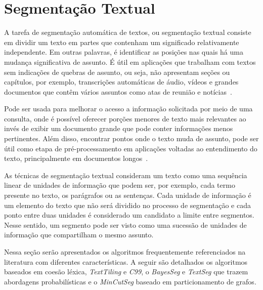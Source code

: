 
\section{Segmentação Textual} \label{sec:segmentacao}






A tarefa de segmentação automática de textos, ou segmentação textual consiste em dividir um texto em partes que contenham um significado relativamente independente. Em outras palavras, é identificar as posições nas quais há uma mudança significativa de assunto. É útil em aplicações que trabalham com textos sem indicações de quebras de assunto, ou seja, não apresentam seções ou capítulos, por exemplo, transcrições automáticas de áudio, vídeos e grandes documentos que contêm vários assuntos como atas de reunião e notícias~\cite{Aggarwal2018, bokaei2015a, sakahara2014a, misra2009a, Eis2008}.

Pode ser usada para melhorar o acesso a informação solicitada por meio de uma consulta, onde é possível oferecer porções menores de texto mais relevantes ao invés de exibir um documento grande que pode conter informações menos pertinentes.  Além disso, encontrar pontos onde o texto muda de assunto, pode ser útil como etapa de pré-processamento em aplicações voltadas ao entendimento do texto, principalmente em documentos longos~\cite{Choi2001-LSA}.

As técnicas de segmentação textual consideram um texto como uma sequência linear de unidades de informação que podem ser, por exemplo, cada termo presente no texto, os parágrafos ou as sentenças. Cada unidade de informação é um elemento do texto que não será dividido no processo de segmentação e cada ponto entre duas unidades é considerado um candidato a limite entre segmentos. Nesse sentido, um segmento pode ser visto como uma sucessão de unidades de informação que compartilham o mesmo assunto.


Nessa seção serão apresentados os algoritmos frequentemente referenciados na literatura  com diferentes características. A seguir são detalhados os algoritmos baseados em coesão léxica, \textit{TextTiling} e \textit{C99}, o \textit{BayesSeg} e \textit{TextSeg} que trazem abordagens probabilísticas e o \textit{MinCutSeg} baseado em particionamento de grafos.















